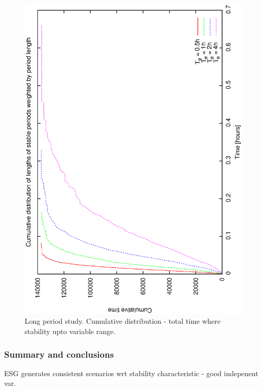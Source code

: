 \begin{figure}[h]
\begin{center}
 \includegraphics[scale=0.5, angle=-90]{figures/e_cumstats.eps}
 \caption[Environmental scenario - cumulative distribution of stable period lengths.] 
   {Long period study. Cumulative distribution - total time where stability upto variable range.}
\label{fig:env_cumstats}
\end{center} 
\end{figure}

\subsubsection{Summary and conclusions}
ESG generates consistent scenarios wrt stability characteristic - good indepenent var.



